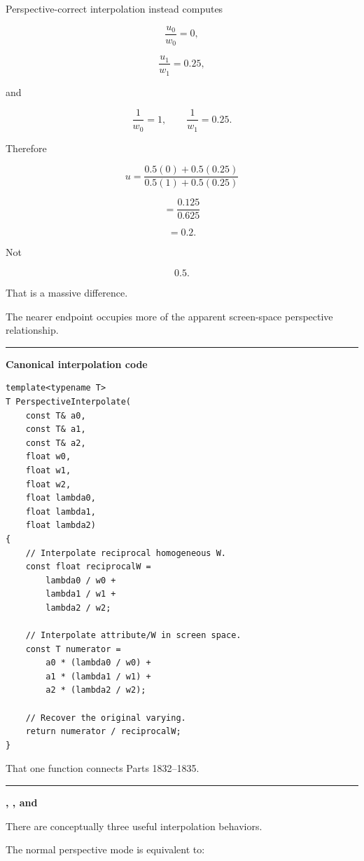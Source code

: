 Perspective-correct interpolation instead computes

\[
\frac{u_0}{w_0}=0,
\]

\[
\frac{u_1}{w_1}=0.25,
\]

and

\[
\frac1{w_0}=1,\qquad
\frac1{w_1}=0.25.
\]

Therefore

\[
u=
\frac{
0.5(0)+0.5(0.25)
}{
0.5(1)+0.5(0.25)
}
\]

\[
=
\frac{0.125}{0.625}
\]

\[
=
0.2.
\]

Not

\[
0.5.
\]

That is a massive difference.

The nearer endpoint occupies more of the apparent screen-space perspective relationship.

\begin{center}\rule{0.5\linewidth}{0.5pt}\end{center}

\textbf{Canonical interpolation code}

\begin{verbatim}
template<typename T>
T PerspectiveInterpolate(
    const T& a0,
    const T& a1,
    const T& a2,
    float w0,
    float w1,
    float w2,
    float lambda0,
    float lambda1,
    float lambda2)
{
    // Interpolate reciprocal homogeneous W.
    const float reciprocalW =
        lambda0 / w0 +
        lambda1 / w1 +
        lambda2 / w2;

    // Interpolate attribute/W in screen space.
    const T numerator =
        a0 * (lambda0 / w0) +
        a1 * (lambda1 / w1) +
        a2 * (lambda2 / w2);

    // Recover the original varying.
    return numerator / reciprocalW;
}
\end{verbatim}

That one function connects Parts 1832--1835.

\begin{center}\rule{0.5\linewidth}{0.5pt}\end{center}

\textbf{, , and }

There are conceptually three useful interpolation behaviors.

The normal perspective mode is equivalent to:

